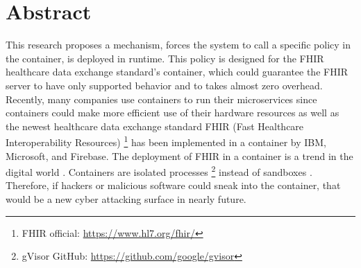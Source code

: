 \chapter*{Abstract}

This research proposes
a mechanism, forces the system to call a specific policy in the container, is deployed in
runtime. This policy is designed for the FHIR healthcare data exchange standard's container, which
could guarantee the FHIR server to have only supported behavior and to takes almost zero overhead.
Recently, many companies use containers to run their microservices since containers could
make more efficient use of their hardware resources as well as the newest healthcare data exchange
standard FHIR (Fast Healthcare Interoperability Resources) 
\footnote{{FHIR official:  \href{https://www.hl7.org/fhir/}{https://www.hl7.org/fhir/}}} has been implemented
in a container by IBM, Microsoft, and Firebase. The deployment of FHIR in a container is a trend
in the digital world \cite{8473370}. 
Containers are isolated processes \footnote{gVisor GitHub: \url{https://github.com/google/gvisor}} 
instead of sandboxes \cite{10.5555/1267569.1267570}. Therefore, if hackers or malicious software could sneak
into the container, that would be a new cyber attacking surface in nearly future.